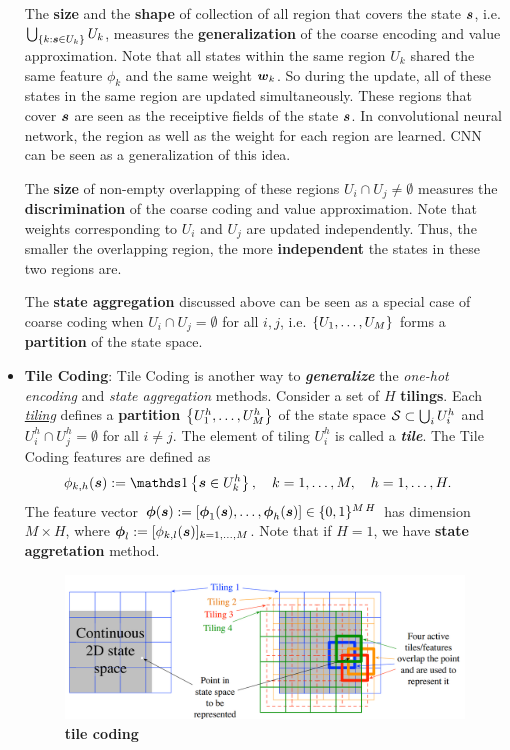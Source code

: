 \documentclass[11pt]{article}
\begin{document}
\begin{itemize}
The  \textbf{size} and the \textbf{shape} of collection of all region  that covers the state $\boldsymbol{s}$, i.e. $\bigcup_{\left\{k: \boldsymbol{s} \in U_{k}\right\}}U_{k}$, measures the \textbf{generalization} of the coarse encoding and  value approximation.  Note that all states within the same region $U_{k}$ shared the same feature $\phi_{k}$ and the same weight $\boldsymbol{w}_{k}$. So during the update, all of these states in the same region are updated simultaneously. These regions that cover $\boldsymbol{s}$ are seen as the receiptive fields of the state $\boldsymbol{s}$. In convolutional neural network, the region as well as the weight for each region are learned. CNN can be seen as a generalization of this idea. 

The \textbf{size} of non-empty overlapping of these regions $U_{i}\cap U_{j} \neq \emptyset$ measures the \textbf{discrimination} of the coarse coding and value approximation. Note that weights corresponding to $U_{i}$ and $U_{j}$ are updated independently. Thus, the smaller the overlapping region, the more \textbf{independent} the states in these two regions are. 

The \textbf{state aggregation} discussed above can be seen as a special case of coarse coding when $U_{i}\cap U_{j} = \emptyset$ for all $i,j$, i.e. $\left\{U_1, \ldots, U_{M}\right\}$ forms a \textbf{partition} of the state space. 

\item \textbf{Tile Coding}: Tile Coding is another way to \textbf{\emph{generalize}} the \emph{one-hot encoding} and \emph{state aggregation} methods. Consider a set of $H$ \textbf{tilings}. Each \underline{\emph{tiling}} defines a \textbf{partition} $\left\{U^{h}_{1},\ldots, U^{h}_{M}\right\}$ of the state space ${\mathcal S} \subset \bigcup_{i}U^{h}_{i}$ and $U_{i}^{h}\cap U^{h}_{j} = \emptyset$ for all $i\neq j$. The element of tiling $U_{i}^{h}$ is called a \textbf{\emph{tile}}. The Tile Coding features are defined as 
\begin{align*}
\phi_{k, h}(\mb{s}) &:= \ind{\mb{s} \in U^{h}_{k}}, \quad k=1,\ldots, M,\quad h=1,\ldots, H.  
\end{align*} The feature vector  $\boldsymbol{\phi}(\boldsymbol{s}) := [\boldsymbol{\phi}_{1}(\boldsymbol{s}), \ldots, \boldsymbol{\phi}_{h}(\boldsymbol{s})] \in \{0,1\}^{M\, H}$ has dimension $M \times H$, where $\boldsymbol{\phi}_{l} := [\phi_{k, l}(\boldsymbol{s})]_{k=1,\ldots, M}$. Note that if $H=1$, we have \textbf{state aggretation} method. 
\begin{figure}
\begin{minipage}[t]{1\linewidth}
  \centering
  \centerline{\includegraphics[scale = 0.3]{tile_coding.png}}
\end{minipage}
\caption{\footnotesize{\textbf{tile coding}}}
\label{fig: tile_coding}
\end{figure}


\end{itemize}
\end{document}

